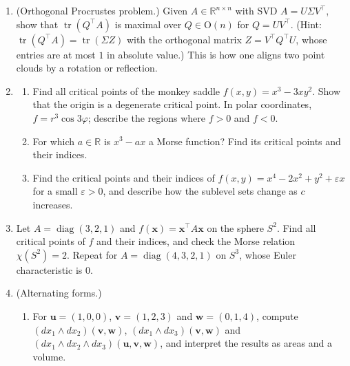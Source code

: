 \documentclass[11pt]{article}
\theoremstyle{definition}
\theoremstyle{plain}
\theoremstyle{remark}
\DeclareMathOperator{\tr}{tr}
\DeclareMathOperator{\diag}{diag}
\begin{document}
\begin{enumerate}[leftmargin=*]
\begin{enumerate}[label=(\alph*)]
        \item For $K_1 = \begin{pmatrix} 0 & 0 & 0 \\ 0 & 0 & -1 \\ 0 & 1 & 0 \end{pmatrix}$, compute $K_1^2$ and $K_1^3$, and show that $e^{tK_1}$ is the rotation by the angle $t$ about the $x_1$-axis.
        \item With $K_2$ and $K_3$ the analogous generators of the rotations about the $x_2$- and $x_3$-axes, check that $[K_1, K_2] = K_3$. What does this say about rotations about different axes?
    \end{enumerate}
    \item\label{exer:procrustes} (Orthogonal Procrustes problem.) Given $A \in \mathbb{R}^{n \times n}$ with SVD $A = U\Sigma V^\top$, show that $\tr(Q^\top A)$ is maximal over $Q \in \mathrm{O}(n)$ for $Q = UV^\top$. (Hint: $\tr(Q^\top A) = \tr(\Sigma Z)$ with the orthogonal matrix $Z = V^\top Q^\top U$, whose entries are at most $1$ in absolute value.) This is how one aligns two point clouds by a rotation or reflection.
    \item \begin{enumerate}[label=(\alph*)]
        \item Find all critical points of the monkey saddle $f(x, y) = x^3 - 3xy^2$. Show that the origin is a degenerate critical point. In polar coordinates, $f = r^3\cos 3\varphi$; describe the regions where $f > 0$ and $f < 0$.
        \item For which $a \in \mathbb{R}$ is $x^3 - ax$ a Morse function? Find its critical points and their indices.
        \item Find the critical points and their indices of $f(x, y) = x^4 - 2x^2 + y^2 + \varepsilon x$ for a small $\varepsilon > 0$, and describe how the sublevel sets change as $c$ increases.
    \end{enumerate}
    \item Let $A = \diag(3, 2, 1)$ and $f(\mathbf{x}) = \mathbf{x}^\top A\mathbf{x}$ on the sphere $S^2$. Find all critical points of $f$ and their indices, and check the Morse relation $\chi(S^2) = 2$. Repeat for $A = \diag(4, 3, 2, 1)$ on $S^3$, whose Euler characteristic is $0$.
    \item\label{exer:wedge} (Alternating forms.)
    \begin{enumerate}[label=(\alph*)]
        \item For $\mathbf{u} = (1, 0, 0)$, $\mathbf{v} = (1, 2, 3)$ and $\mathbf{w} = (0, 1, 4)$, compute $(dx_1 \wedge dx_2)(\mathbf{v}, \mathbf{w})$, $(dx_1 \wedge dx_3)(\mathbf{v}, \mathbf{w})$ and $(dx_1 \wedge dx_2 \wedge dx_3)(\mathbf{u}, \mathbf{v}, \mathbf{w})$, and interpret the results as areas and a volume.

\end{enumerate}
\end{enumerate}
\end{document}
